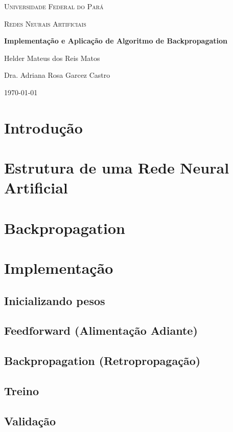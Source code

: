 \documentclass[12pt,a4paper]{article}
\begin{document}
\begin{titlepage}
	\centering
	{\scshape\LARGE Universidade Federal do Pará \par}
	\vspace{1cm}
	{\scshape\Large Redes Neurais Artificiais\par}
	\vspace{1.5cm}
	{\huge\bfseries Implementação e Aplicação de Algoritmo de Backpropagation\par}
	\vspace{2cm}
	{\Large Helder Mateus dos Reis Matos\par}
	\vfill
	Dra. Adriana Rosa Garcez Castro

	\vfill

	{\large \today\par}
\end{titlepage}

\tableofcontents

\section{Introdução}
\section{Estrutura de uma Rede Neural Artificial}
\section{Backpropagation}
\section{Implementação}
\subsection{Inicializando pesos}
\subsection{Feedforward (Alimentação Adiante)}
\subsection{Backpropagation (Retropropagação)}
\subsection{Treino}
\subsection{Validação}
\end{document}
